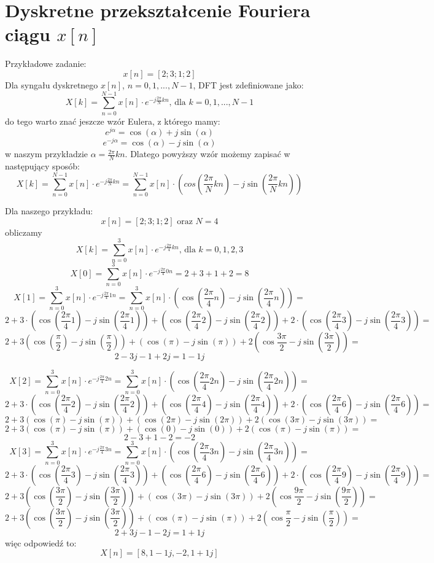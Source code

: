 \documentclass{article}
\begin{document}
\section{Dyskretne przekształcenie Fouriera ciągu $x[n]$}
Przykładowe zadanie:
\[
    x[n]=[2;3;1;2]
\]
Dla syngału dyskretnego $x[n]$, $n = 0,1,...,N-1$, DFT jest zdefiniowane jako:
\[
    X[k]=\sum_{n=0}^{N-1}x[n] \cdot e^{-j \frac{2 \pi}{N} k n}\text{, dla } k = 0,1,...,N - 1
\]
do tego warto znać jeszcze wzór Eulera, z którego mamy:
\[
    e^{j \alpha} = \cos(\alpha) + j \sin(\alpha)
\]
\[
    e^{-j \alpha} = \cos(\alpha) - j \sin(\alpha)
\]
w naszym przykładzie $\alpha = \frac{2 \pi}{N} k n$. Dlatego powyższy wzór możemy zapisać w następujący sposób:
\[
    X[k]=\sum_{n=0}^{N-1}x[n] \cdot e^{-j \frac{2 \pi}{N} k n} = \sum_{n=0}^{N-1}x[n] \cdot (cos(\frac{2 \pi}{N} k n) - j \sin(\frac{2 \pi}{N} k n))
\]

Dla naszego przykładu:
\[
    x[n]=[2;3;1;2] \text{ oraz } N = 4
\]
obliczamy
\[
    X[k]=\sum_{n=0}^{3}x[n] \cdot e^{-j \frac{2 \pi}{4} k n}\text{, dla } k = 0,1,2,3
\]
\[
    X[0]=\sum_{n=0}^{3}x[n] \cdot e^{-j \frac{2 \pi}{4} 0 n} =
    2 + 3 + 1 + 2 = 8
\]
\[
    X[1]=\sum_{n=0}^{3}x[n] \cdot e^{-j \frac{2 \pi}{4} 1 n} = \sum_{n=0}^{3}x[n] \cdot (\cos(\frac{2 \pi}{4}n) - j \sin(\frac{2 \pi}{4}n)) = 
\]
\[
    2 + 3 \cdot (\cos(\frac{2 \pi}{4} 1) - j \sin(\frac{2 \pi}{4} 1)) + (\cos(\frac{2 \pi}{4} 2) - j \sin(\frac{2 \pi}{4} 2))
    + 2 \cdot (\cos(\frac{2 \pi}{4} 3) - j \sin(\frac{2 \pi}{4} 3)) = 
\]
\[
    2 + 3(\cos(\frac{\pi}{2}) - j\sin(\frac{\pi}{2})) + (\cos(\pi) - j \sin(\pi)) + 2(\cos{\frac{3\pi}{2}} - j\sin(\frac{3\pi}{2})) = 
\]
\[
    2 - 3j - 1 + 2j = 1 - 1j
\]

\[
    X[2]=\sum_{n=0}^{3}x[n] \cdot e^{-j \frac{2 \pi}{4} 2 n} = 
    \sum_{n=0}^{3}x[n] \cdot (\cos(\frac{2 \pi}{4}2n) - j \sin(\frac{2 \pi}{4}2n)) = 
\]
\[
    2 + 3 \cdot (\cos(\frac{2 \pi}{4} 2) - j \sin(\frac{2 \pi}{4} 2)) + (\cos(\frac{2 \pi}{4} 4) - j \sin(\frac{2 \pi}{4} 4))
    + 2 \cdot (\cos(\frac{2 \pi}{4} 6) - j \sin(\frac{2 \pi}{4} 6)) = 
\]
\[
    2 + 3(\cos(\pi) - j\sin(\pi)) + (\cos(2\pi) - j \sin(2\pi)) + 2(\cos{(3\pi)} - j\sin(3\pi)) = 
\]
\[
    2 + 3(\cos(\pi) - j\sin(\pi)) + (\cos(0) - j \sin(0)) + 2(\cos{(\pi)} - j\sin(\pi)) = 
\]
\[
    2 - 3 + 1 - 2 = -2
\]
\newpage
\[
    X[3]=\sum_{n=0}^{3}x[n] \cdot e^{-j \frac{2 \pi}{4} 3 n} = 
    \sum_{n=0}^{3}x[n] \cdot (\cos(\frac{2 \pi}{4}3n) - j \sin(\frac{2 \pi}{4}3n)) = 
\]
\[
    2 + 3 \cdot (\cos(\frac{2 \pi}{4} 3) - j \sin(\frac{2 \pi}{4} 3)) + (\cos(\frac{2 \pi}{4} 6) - j \sin(\frac{2 \pi}{4} 6))
    + 2 \cdot (\cos(\frac{2 \pi}{4} 9) - j \sin(\frac{2 \pi}{4} 9)) = 
\]
\[
    2 + 3(\cos(\frac{3\pi}{2}) - j\sin(\frac{3\pi}{2})) + (\cos(3\pi) - j \sin(3\pi)) + 2(\cos{\frac{9\pi}{2}} - j\sin(\frac{9\pi}{2})) = 
\]
\[
    2 + 3(\cos(\frac{3\pi}{2}) - j\sin(\frac{3\pi}{2})) + (\cos(\pi) - j \sin(\pi)) + 2(\cos{\frac{\pi}{2}} - j\sin(\frac{\pi}{2})) = 
\]
\[
    2 + 3j - 1 - 2j = 1 + 1j
\]
więc odpowiedź to:
\[
    X[n] = [8, 1 - 1j, -2, 1 + 1j]
\]
\end{document}
